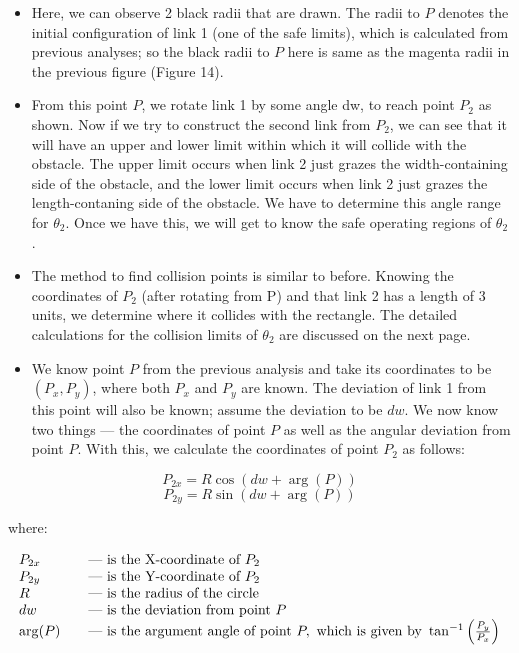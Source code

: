 \documentclass[12pt]{article}
\begin{document}
\begin{itemize}
    \item Here, we can observe 2 black radii that are drawn. The radii to $P$ denotes the initial configuration of link 1 (one of the safe limits), which is calculated from previous analyses; so the black radii to $P$ here is same as the magenta radii in the previous figure (Figure 14).
    
    \item From this point $P$, we rotate link 1 by some angle dw, to reach point $P_2$ as shown. Now if we try to construct the second link from $P_2$, we can see that it will have an upper and lower limit within which it will collide with the obstacle. The upper limit occurs when link 2 just grazes the width-containing side of the obstacle, and the lower limit occurs when link 2 just grazes the length-contaning side of the obstacle. We have to determine this angle range for $\theta_2$. Once we have this, we will get to know the safe operating regions of $\theta_2$.

    \item The method to find collision points is similar to before. Knowing the coordinates of $P_2$ (after rotating from P) and that link 2 has a length of 3 units, we determine where it collides with the rectangle. The detailed calculations for the collision limits of $\theta_2$ are discussed on the next page.
    
    \item We know point \(P\) from the previous analysis and take its coordinates to be \((P_x, P_y)\), where both \(P_x\) and \(P_y\) are known. The deviation of link 1 from this point will also be known; assume the deviation to be \(dw\). We now know two things — the coordinates of point \(P\) as well as the angular deviation from point \(P\). With this, we calculate the coordinates of point \(P_2\) as follows:
\end{itemize}

\[
P_{2x} = R \cos(dw + \arg(P))
\]
\[
P_{2y} = R \sin(dw + \arg(P))
\]

where:

\[
\begin{array}{l l}
P_{2x}  & \quad \text{--- is the X-coordinate of } P_2 \\
P_{2y}  & \quad \text{--- is the Y-coordinate of } P_2 \\
R       & \quad \text{--- is the radius of the circle} \\
dw      & \quad \text{--- is the deviation from point } P \\
\arg(P) & \quad \text{--- is the argument angle of point } P, \text{ which is given by } \tan^{-1} \left( \frac{P_y}{P_x} \right)
\end{array}
\]
\end{document}
